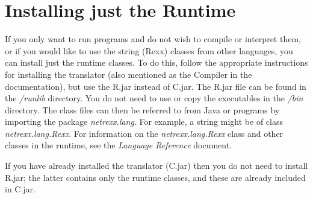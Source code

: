 \section{Installing just the \nr{} Runtime}
If you only want to run \nr{} programs and do not wish to compile or
interpret them, or if you would like to use the \nr{} string (Rexx)
classes from other languages, you can install just the \nr{} runtime
classes.
\newline
To do this, follow the appropriate instructions for installing the
translator (also mentioned as the Compiler in the documentation), but use the \nr{}R.jar instead of \nr{}C.jar.
The \nr{}R.jar file can be found in the \emph{\nr{}/runlib} directory.
\newline
You do not need to use or copy the executables in the \emph{\nr{}/bin}
directory.
\newline
The \nr{} class files can then be referred to from Java or \nr{}
programs by importing the package \emph{netrexx.lang}.  For
example, a string might be of class \emph{netrexx.lang.Rexx}.
\newline
For information on the \emph{netrexx.lang.Rexx} class and other classes
in the runtime, see the \emph{\nr{} Language Reference} document.

\begin{shaded}
If you have already installed the \nr{} translator
(\nr{}C.jar) then you do not need to install \nr{}R.jar; the latter
contains only the \nr{} runtime classes, and these are already
included in \nr{}C.jar.
\end{shaded}

